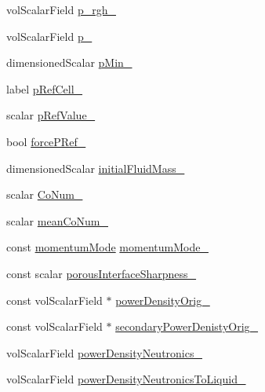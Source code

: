 \begin{DoxyCompactItemize}
\item 
vol\+Scalar\+Field \hyperlink{classFoam_1_1thermalHydraulicsModel_afdbf96b12d6392fa89f458b7a8de824f}{p\+\_\+rgh\+\_\+}
\item 
vol\+Scalar\+Field \hyperlink{classFoam_1_1thermalHydraulicsModel_a046e1b47b02387ed562cee689bb64a71}{p\+\_\+}
\item 
dimensioned\+Scalar \hyperlink{classFoam_1_1thermalHydraulicsModel_a8d9ffc0d656a1bdc69100433ae32a84a}{p\+Min\+\_\+}
\item 
label \hyperlink{classFoam_1_1thermalHydraulicsModel_a0bd6a80f2ef015bf6724b541e8df7f36}{p\+Ref\+Cell\+\_\+}
\item 
scalar \hyperlink{classFoam_1_1thermalHydraulicsModel_acfd7a5d62b16b07054fb81aecb54b887}{p\+Ref\+Value\+\_\+}
\item 
bool \hyperlink{classFoam_1_1thermalHydraulicsModel_ad5dd7b9c4bf54145bda6ef67229efc26}{force\+P\+Ref\+\_\+}
\item 
dimensioned\+Scalar \hyperlink{classFoam_1_1thermalHydraulicsModel_af827a26914cf2cb555913618c9c74c17}{initial\+Fluid\+Mass\+\_\+}
\item 
scalar \hyperlink{classFoam_1_1thermalHydraulicsModel_a849f0259dd9eb2034b832b7453014d8f}{Co\+Num\+\_\+}
\item 
scalar \hyperlink{classFoam_1_1thermalHydraulicsModel_a60c143504830e085a6fda66e13a5f3f9}{mean\+Co\+Num\+\_\+}
\item 
const \hyperlink{classFoam_1_1thermalHydraulicsModel_a75b783d2202a216abbc0ef52858e2267}{momentum\+Mode} \hyperlink{classFoam_1_1thermalHydraulicsModel_ac231f93a895cc83da9d49a19d8bcb597}{momentum\+Mode\+\_\+}
\item 
const scalar \hyperlink{classFoam_1_1thermalHydraulicsModel_a5b1d22b8b39b2be6860d7e75d00190b2}{porous\+Interface\+Sharpness\+\_\+}
\item 
const vol\+Scalar\+Field $\ast$ \hyperlink{classFoam_1_1thermalHydraulicsModel_a23f8a8cd25603cf78f5f402fd280d001}{power\+Density\+Orig\+\_\+}
\item 
const vol\+Scalar\+Field $\ast$ \hyperlink{classFoam_1_1thermalHydraulicsModel_ac33644113ac3b2e5e9d5bdff791f7a0c}{secondary\+Power\+Denisty\+Orig\+\_\+}
\item 
vol\+Scalar\+Field \hyperlink{classFoam_1_1thermalHydraulicsModel_ad596330a3a089673ef489c991dba8d30}{power\+Density\+Neutronics\+\_\+}
\item 
vol\+Scalar\+Field \hyperlink{classFoam_1_1thermalHydraulicsModel_a2d2d2a1eceb33ae3d23c1231cf598f40}{power\+Density\+Neutronics\+To\+Liquid\+\_\+}
\end{DoxyCompactItemize}



